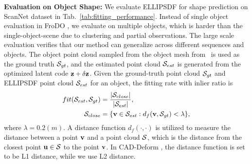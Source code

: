 

{\vspace{1ex}\bf \noindent Evaluation on Object Shape: }%
We evaluate ELLIPSDF for shape prediction on ScanNet \cite{dai2017scannet} dataset in Tab.~\ref{tab:fitting_performance}. Instead of single object evaluation in FroDO \cite{runz2020frodo}, we evaluate on multiple objects, which is harder than the single-object-scene due to clustering and partial observations. The large scale evaluation verifies that our method can generalize across different sequences and objects.
The object point cloud sampled from the object mesh from~\cite{avetisyan2019scan2cad} is used as the ground truth ${\cal S}_{gt}$, and the estimated point cloud ${\cal S}_{est}$ is generated from the optimized latent code $\bf{z} + \delta \bf{z}$. 
Given the ground-truth point cloud ${\cal S}_{gt}$ and ELLIPSDF point cloud ${\cal S}_{est}$ for an object, the fitting rate with inlier ratio is
\begin{equation} 
\begin{aligned} \label{eq:fitting}
fit({\cal S}_{est}, {\cal S}_{gt}) &= \frac{\vert {\cal S}_{close} \vert}{\vert {\cal S}_{est} \vert}, \\
{\cal S}_{close} &= \{\mathbf{v} \in {\cal S}_{est}: d_f(\mathbf{v}, {\cal S}_{gt}) < \lambda \}, 
\end{aligned}
\end{equation}
where $\lambda = 0.2 (m)$. A distance function $d_f(\cdot, \cdot)$ is utilized to measure the distance between a point $\mathbf{v}$ and a point cloud ${\cal S}$, which is the distance from the closest point $\mathbf{u} \in {\cal S}$ to the point $\mathbf{v}$. In CAD-Deform \cite{ishimtsev2020cad}, the distance function is set to be L1 distance, while we use L2 distance.

